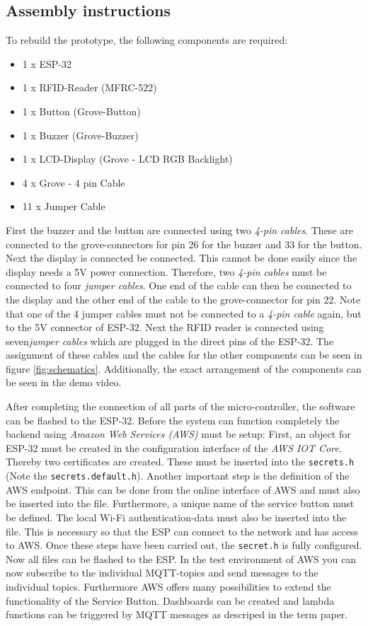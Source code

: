 \documentclass{sigchi}
\begin{document}
\subsection{Assembly instructions}
\label{sec:Assemblyinstructions}

To rebuild the prototype, the following components are required:
\begin{itemize}
\item 1 x ESP-32
\item 1 x RFID-Reader (MFRC-522)
\item 1 x Button (Grove-Button) 
\item 1 x Buzzer (Grove-Buzzer)
\item 1 x LCD-Display (Grove - LCD RGB Backlight)
\item 4 x Grove - 4 pin Cable
\item 11 x Jumper Cable
\end{itemize}

First the buzzer and the button are connected using two \textit{4-pin cables}. These are connected to the grove-connectors for pin 26 for the buzzer and 33 for the button. Next the display is connected be connected. This cannot be done easily since the display needs a 5V power connection. Therefore, two \textit{4-pin cables} must be connected to four \textit{jumper cables}. One end of the cable can then be connected to the display and the other end of the cable to the grove-connector for pin 22. Note that one of the 4 jumper cables must not be connected to a \textit{4-pin cable} again, but to the 5V connector of ESP-32.
Next the RFID reader is connected using seven\textit{jumper cables} which are plugged in the direct pins of the ESP-32. 
The assignment of these cables and the cables for the other components can be seen in figure \ref{fig:schematics}.
Additionally, the exact arrangement of the components can be seen in the demo video.

After completing the connection of all parts of the micro-controller, the software can be flashed to the ESP-32. Before the system can function completely the backend using \textit{Amazon Web Services (AWS)} must be setup: First, an object for ESP-32 must be created in the configuration interface of the \textit{AWS IOT Core}. Thereby two certificates are created. These must be inserted into the \texttt{secrets.h} (Note the \texttt{secrets.default.h}). Another important step is the definition of the AWS endpoint. This can be done from the online interface of AWS and must also be inserted into the file. Furthermore, a unique name of the service button must be defined. The local Wi-Fi authentication-data must also be inserted into the file. This is necessary so that the ESP can connect to the network and has access to AWS. Once these steps have been carried out, the \texttt{secret.h} is fully configured. Now all files can be flashed to the ESP. In the test environment of AWS you can now subscribe to the individual MQTT-topics and send messages to the individual topics. Furthermore AWS offers many possibilities to extend the functionality of the Service Button. Dashboards can be created and lambda functions can be triggered by MQTT messages as descriped in the term paper.

\balance{}
\end{document}
